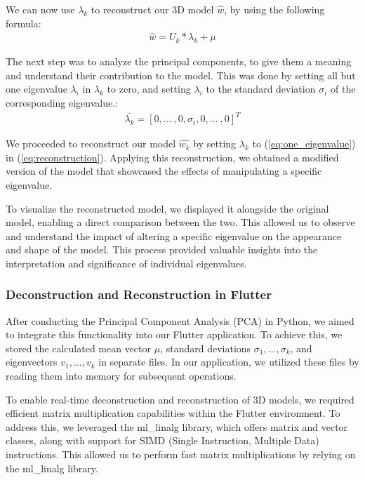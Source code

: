 We can now use $\lambda_k$ to reconstruct our 3D model $\hat{w}$, by using the following formula:
\begin{align}\label{eq:reconstruction}
    \hat{w} = U_k * \lambda_k + \mu
\end{align}


The next step was to analyze the principal components, to give them a meaning and understand their contribution to the model. This was done by setting all but one eigenvalue $\lambda_i$ in $\lambda_k$ to zero,
and setting $\lambda_i$ to the standard deviation $\sigma_i$ of the corresponding eigenvalue.:
\begin{align}\label{eq:one_eigenvalue}
    \bar{\lambda_k} = [0, ...\ , 0, \sigma_i, 0,...\ ,0]^T
\end{align}

We proceeded to reconstruct our model $\hat{w_k}$ by setting $\lambda_k$ to (\ref{eq:one_eigenvalue}) in (\ref{eq:reconstruction}). Applying this reconstruction, we obtained a modified version of the model 
that showcased the effects of manipulating a specific eigenvalue.

To visualize the reconstructed model, we displayed it alongside the original model, enabling a direct comparison between the two. This allowed us to observe and understand the impact 
of altering a specific eigenvalue on the appearance and shape of the model. This process provided valuable insights into the interpretation and significance of individual eigenvalues.

\subsubsection{Deconstruction and Reconstruction in Flutter}

After conducting the Principal Component Analysis (PCA) in Python, we aimed to integrate this functionality into our Flutter application. To achieve this, we stored the calculated mean vector $\mu$, 
standard deviations $\sigma_1, \ldots, \sigma_k$, and eigenvectors $v_1, \ldots, v_k$ in separate files. In our application, we utilized these files by reading them into memory for subsequent operations.

To enable real-time deconstruction and reconstruction of 3D models, we required efficient matrix multiplication capabilities within the Flutter environment. To address this, we leveraged the ml\_linalg library, 
which offers matrix and vector classes, along with support for SIMD (Single Instruction, Multiple Data) instructions. This allowed us to perform fast matrix multiplications by relying on the ml\_linalg library.

